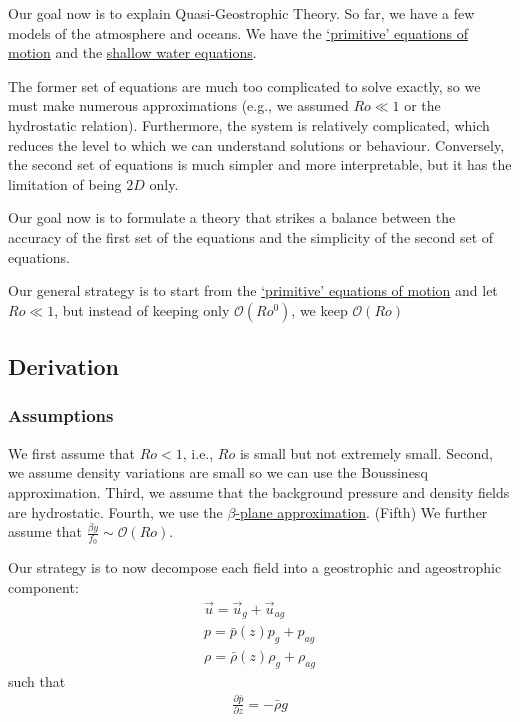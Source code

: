 Our goal now is to explain Quasi-Geostrophic Theory. So far, we have a few models of the atmosphere and oceans. We have the \hyperref[Eqns for GFD Box]{`primitive' equations of motion} and the \hyperref[Shallow Water System]{shallow water equations}. 

The former set of equations are much too complicated to solve exactly, so we must make numerous approximations (e.g., we assumed \(Ro\ll 1\) or the hydrostatic relation). Furthermore, the system is relatively complicated, which reduces the level to which we can understand solutions or behaviour. Conversely, the second set of equations is much simpler and more interpretable, but it has the limitation of being \(2D\) only.

Our goal now is to formulate a theory that strikes a balance between the accuracy of the first set of the equations and the simplicity of the second set of equations.

Our general strategy is to start from the \hyperref[Eqns for GFD Box]{`primitive' equations of motion} and let \(Ro\ll 1\), but instead of keeping only \(\mathcal{O}(Ro^0)\), we keep \(\mathcal{O}(Ro)\)

\subsection{Derivation}

\subsubsection{Assumptions}

We first assume that \(Ro<1\), i.e., \(Ro\) is small but not extremely small. Second, we assume density variations are small so we can use the Boussinesq approximation. Third, we assume that the background pressure and density fields are hydrostatic. Fourth, we use the \hyperref[beta plane box]{\(\beta\)-plane approximation}. (Fifth) We further assume that \(\frac{\beta y}{f_0}\sim \mathcal{O}(Ro)\).

Our strategy is to now decompose each field into a geostrophic and ageostrophic component:
\begin{align*}
    \vec{u} = \vec{u}_g + \vec{u}_{ag}
    \\
    p = \bar{p}(z) p_g + p_{ag}
    \\
    \rho = \bar{\rho}(z) \rho_g + \rho_{ag}
\end{align*}
such that
\begin{align*}
    \frac{\partial \bar{p}}{\partial z} = -\bar{\rho}g
\end{align*}

